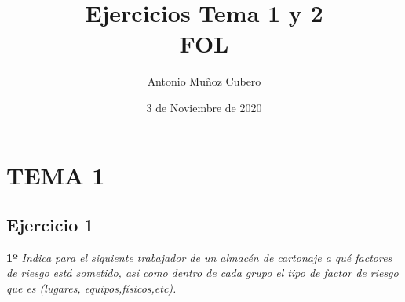 \documentclass{article}
\title{Ejercicios Tema 1 y 2 \\ \textbf{FOL}}
\author{Antonio Muñoz Cubero}
\date{3 de Noviembre de 2020}
\begin{document}
  \maketitle
    \tableofcontents

  \newpage
    \section{TEMA 1}
      \subsection{Ejercicio 1}
        \textbf{1º} \textit{Indica para el siguiente trabajador de un almacén de cartonaje a qué factores de riesgo está sometido, así como dentro de cada grupo el tipo de factor de riesgo que es (lugares, equipos,físicos,etc).}
        \\
\end{document}
